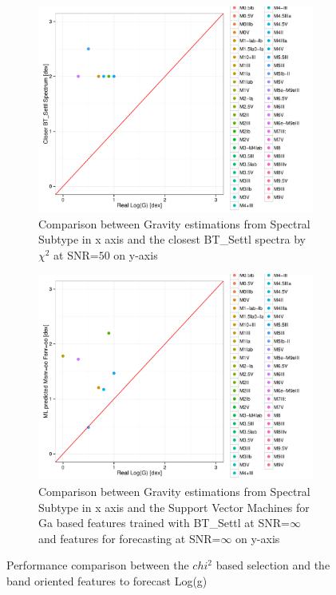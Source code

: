 {\begin {figure}
 \centering
 \begin{subfigure}{.85\textwidth}
  \centering
  \includegraphics[width=12cm]{figs/G_chi2_50_cesetti.pdf}
  \caption{Comparison between Gravity estimations from Spectral Subtype 
 in x axis and the closest BT\_Settl spectra by $\chi^2$ at SNR=$50$ on y-axis}
 \label{fig:chi2_50_spt}
 \end{subfigure}
  \begin{subfigure}{.85\textwidth}
  \centering
  \includegraphics[width=12cm]{figs/G_gam_oo_cesetti.pdf}
  \caption{Comparison between Gravity estimations from Spectral Subtype 
 in x axis and the Support Vector Machines for Ga based features trained with BT\_Settl 
 at SNR=$\infty$ and features for forecasting at SNR=$\infty$ on y-axis}
 \label{fig:ga_too50ga_spt}
 \end{subfigure}
 \label {fig:comp02}
 \caption{Performance comparison between the $chi^2$ based selection 
          and the band oriented features to forecast Log(g)}
\end {figure}
%


}

